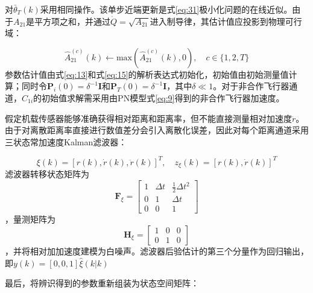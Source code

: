 对${\bar \theta _T}(k)$采用相同操作。该单步近端更新是式\eqref{eq:31}极小化问题的在线近似。由于${A_{21}}$是平方项之和，并通过$\dot Q = \sqrt {{A_{21}}} $进入制导律，其估计值应投影到物理可行域：

\begin{equation}
\label{eq:37}
\hat A_{21}^{(c)}(k) \leftarrow {\text{max}}(\hat A_{21}^{(c)}(k),0),\quad c \in \{ 1,2,T\}
\end{equation}
参数估计值由式\eqref{eq:13}和式\eqref{eq:15}的解析表达式初始化，初始值由初始测量值计算；同时令${{\mathbf{P}}_i}(0) = {\delta ^{ - 1}}{\mathbf{I}}$和${{\mathbf{P}}_T}(0) = {\delta ^{ - 1}}{\mathbf{I}}$，其中$\delta  \ll 1$。对于非合作飞行器通道，${C_{1i}}$的初始值求解需采用由PN模型式\eqref{eq:9}得到的非合作飞行器加速度。

假定机载传感器能够准确获得相对距离和距离率，但不能直接测量相对加速度$\ddot r$。由于对离散距离率直接进行数值差分会引入离散化误差，因此对每个距离通道采用三状态常加速度Kalman滤波器：

\begin{equation}
\label{eq:38}
\xi (k) = {[r(k),\dot r(k),\ddot r(k)]^T},\quad {z_\xi }(k) = {[r(k),\dot r(k)]^T}
\end{equation}
滤波器转移状态矩阵为\[{{\mathbf{F}}_\xi } = \left[ {\begin{array}{*{20}{c}}
  1&{\Delta t}&{\tfrac{1}{2}\Delta {t^2}} \\ 
  0&1&{\Delta t} \\ 
  0&0&1 
\end{array}} \right]\]，量测矩阵为\[{{\mathbf{H}}_\xi } = \begin{bmatrix}
  1 & 0 & 0 \\
  0 & 1 & 0
\end{bmatrix}\]，并将相对加加速度建模为白噪声。滤波器后验估计的第三个分量作为回归输出，即$y(k) = [0,0,1]\widehat \xi (k|k)$

最后，将辨识得到的参数重新组装为状态空间矩阵：


